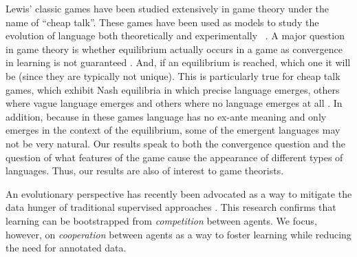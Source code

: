Lewis' classic games have been studied extensively in game theory under the name of ``cheap talk''. These games have been used as models to study the evolution of
language both theoretically and experimentally
~\citep{crawford:1998survey,blume:1998experimental,crawford1982strategic}. A
major question in game theory is whether equilibrium actually occurs in a game as
convergence in learning is not guaranteed
\citep{fudenberg2014recency,roth1995learning}. And, if an equilibrium is reached, which one it will be
(since they are typically not unique). This is particularly true for
cheap talk games, which exhibit Nash equilibria in which precise language emerges, others where vague language
emerges and others where no language emerges at all
\citep{crawford1982strategic}. In addition, because in these games
language has no ex-ante meaning and only emerges in the context of the
equilibrium, some of the emergent languages may not be very natural.  Our results speak to both the convergence question and the
question of what features of the game cause the appearance of
different types of languages. Thus, our results are also of interest
to game theorists.

An evolutionary perspective has recently been advocated as a way
to mitigate the data hunger of traditional supervised approaches
\citep{Goodfellow:etal:2014, Silver:etal:2016}. This research confirms that 
learning can be
bootstrapped from \emph{competition} between agents. We focus,
however, on \emph{cooperation} between agents as a way to foster
learning while reducing the need for annotated data.

